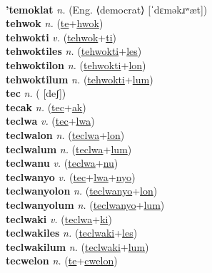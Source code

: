  \label{tensoki} \\
\textbf{'temoklat} \textit{n.} (Eng. ⟨democrat⟩ [ˈdɛməkɹʷæt])
 \label{'temoklat} \\
\textbf{tehwok} \textit{n.} (\hyperref[te]{te}+\hyperref[hwok]{hwok})
 \label{tehwok} \\
\textbf{tehwokti} \textit{v.} (\hyperref[tehwok]{tehwok}+\hyperref[ti]{ti})
 \label{tehwokti} \\
\textbf{tehwoktiles} \textit{n.} (\hyperref[tehwokti]{tehwokti}+\hyperref[les]{les})
 \label{tehwoktiles} \\
\textbf{tehwoktilon} \textit{n.} (\hyperref[tehwokti]{tehwokti}+\hyperref[lon]{lon})
 \label{tehwoktilon} \\
\textbf{tehwoktilum} \textit{n.} (\hyperref[tehwokti]{tehwokti}+\hyperref[lum]{lum})
 \label{tehwoktilum} \\
\textbf{tec} \textit{n.} ( [deʃ])
 \label{tec} \\
\textbf{tecak} \textit{n.} (\hyperref[tec]{tec}+\hyperref[ak]{ak})
 \label{tecak} \\
\textbf{teclwa} \textit{v.} (\hyperref[tec]{tec}+\hyperref[lwa]{lwa})
 \label{teclwa} \\
\textbf{teclwalon} \textit{n.} (\hyperref[teclwa]{teclwa}+\hyperref[lon]{lon})
 \label{teclwalon} \\
\textbf{teclwalum} \textit{n.} (\hyperref[teclwa]{teclwa}+\hyperref[lum]{lum})
 \label{teclwalum} \\
\textbf{teclwanu} \textit{v.} (\hyperref[teclwa]{teclwa}+\hyperref[nu]{nu})
 \label{teclwanu} \\
\textbf{teclwanyo} \textit{v.} (\hyperref[tec]{tec}+\hyperref[lwa]{lwa}+\hyperref[nyo]{nyo})
 \label{teclwanyo} \\
\textbf{teclwanyolon} \textit{n.} (\hyperref[teclwanyo]{teclwanyo}+\hyperref[lon]{lon})
 \label{teclwanyolon} \\
\textbf{teclwanyolum} \textit{n.} (\hyperref[teclwanyo]{teclwanyo}+\hyperref[lum]{lum})
 \label{teclwanyolum} \\
\textbf{teclwaki} \textit{v.} (\hyperref[teclwa]{teclwa}+\hyperref[ki]{ki})
 \label{teclwaki} \\
\textbf{teclwakiles} \textit{n.} (\hyperref[teclwaki]{teclwaki}+\hyperref[les]{les})
 \label{teclwakiles} \\
\textbf{teclwakilum} \textit{n.} (\hyperref[teclwaki]{teclwaki}+\hyperref[lum]{lum})
 \label{teclwakilum} \\
\textbf{tecwelon} \textit{n.} (\hyperref[te]{te}+\hyperref[cwelon]{cwelon})
